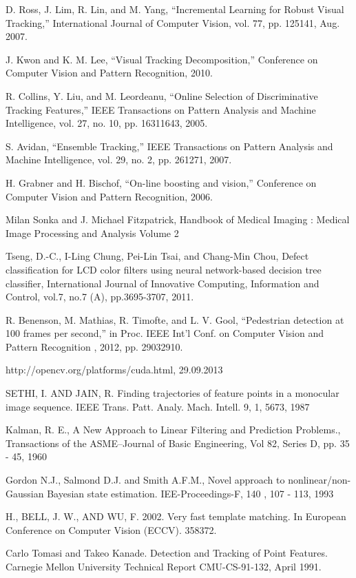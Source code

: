 \begin{thebibliography}{SMAT}
D. Ross, J. Lim, R. Lin, and M. Yang, \textquotedblleft{}Incremental Learning for Robust Visual Tracking,\textquotedblright{} International Journal of Computer Vision, vol. 77, pp. 125\textendash{}141, Aug. 2007.

J. Kwon and K. M. Lee, \textquotedblleft{}Visual Tracking Decomposition,\textquotedblright{} Conference on Computer Vision and Pattern Recognition, 2010.

R. Collins, Y. Liu, and M. Leordeanu, \textquotedblleft{}Online Selection of Discriminative Tracking Features,\textquotedblright{} IEEE Transactions on Pattern Analysis and Machine Intelligence, vol. 27, no. 10, pp. 1631\textendash{}1643, 2005.

S. Avidan, \textquotedblleft{}Ensemble Tracking,\textquotedblright{} IEEE Transactions on Pattern Analysis and Machine Intelligence, vol. 29, no. 2, pp. 261\textendash{}271, 2007.

H. Grabner and H. Bischof, \textquotedblleft{}On-line boosting and vision,\textquotedblright{} Conference on Computer Vision and Pattern Recognition, 2006.

Milan Sonka and J. Michael Fitzpatrick, Handbook of Medical Imaging : Medical Image Processing and Analysis Volume 2

Tseng, D.-C., I-Ling Chung, Pei-Lin Tsai, and Chang-Min Chou, \textquotedbl{}Defect classification for LCD color filters using neural network-based decision tree classifier,\textquotedbl{} International Journal of Innovative Computing, Information and Control, vol.7, no.7 (A), pp.3695-3707, 2011.

R. Benenson, M. Mathias, R. Timofte, and L. V. Gool, \textquotedblleft{}Pedestrian detection at 100 frames per second,\textquotedblright{} in Proc. IEEE Int\textquoteright{}l Conf. on Computer Vision and Pattern Recognition , 2012, pp. 2903\textendash{}2910.

http://opencv.org/platforms/cuda.html, 29.09.2013

SETHI, I. AND JAIN, R. Finding trajectories of feature points in a monocular image sequence. IEEE Trans. Patt. Analy. Mach. Intell. 9, 1, 56\textendash{}73, 1987

Kalman, R. E., A New Approach to Linear Filtering and Prediction Problems., Transactions of the ASME--Journal of Basic Engineering, Vol 82, Series D, pp. 35 - 45, 1960 

 Gordon N.J., Salmond D.J. and Smith A.F.M., Novel approach to nonlinear/non-Gaussian Bayesian state estimation. IEE-Proceedings-F, 140 , 107 - 113, 1993

 H., BELL, J. W., AND WU, F. 2002. Very fast template matching. In European Conference on Computer Vision (ECCV). 358\textendash{}372.

Carlo Tomasi and Takeo Kanade. Detection and Tracking of Point Features. Carnegie Mellon University Technical Report CMU-CS-91-132, April 1991.

\end{thebibliography}